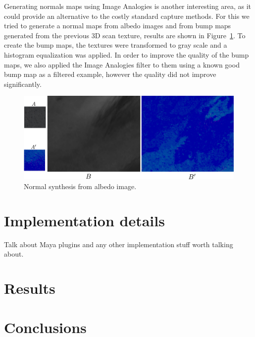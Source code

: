 \documentclass[11pt]{report}
\begin{document}
Generating normals maps using Image Analogies is another interesting area, as it could provide an alternative to the costly standard capture methods.
For this we tried to generate a normal maps from albedo images and from bump maps generated from the previous 3D scan texture, results are shown in Figure~\ref{fig:normal_synthesis}. 
To create the bump maps, the textures were transformed to gray scale and a histogram equalization was applied.
In order to improve the quality of the bump maps, we also applied the Image Analogies filter to them using a known good bump map as a filtered example, however the quality did not improve significantly.

\begin{figure}[htbp!]
\centering
\includegraphics[width=\textwidth]{img/normal_generation}
	\caption{ Normal synthesis from albedo image.}
	\label{fig:normal_synthesis}
\end{figure}

\chapter{Implementation details}
\label{sec:implementation_details}

Talk about Maya plugins and any other implementation stuff worth talking about. 

\chapter{Results}


\chapter{Conclusions}


\newpage


\end{document}
